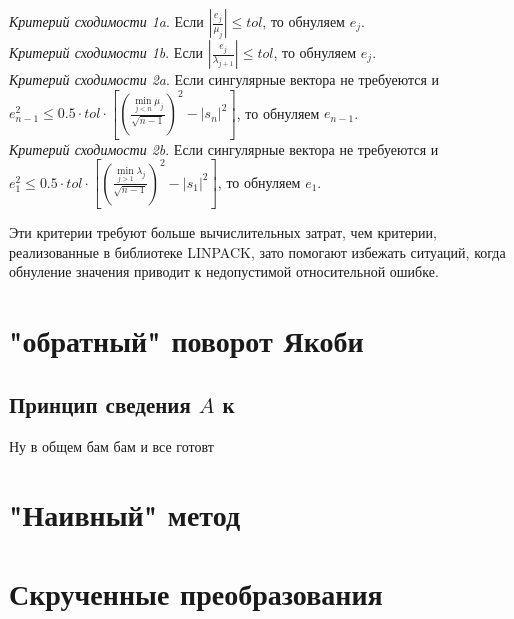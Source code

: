 \documentclass[12pt, a4paper]{report}
\theoremstyle{note}
\begin{document}
\noindent\textit{Критерий сходимости 1a}. Если $|\frac{e_j}{\mu_j}|\leq tol$, то обнуляем $e_j$.\vspace{1em}
\\\textit{Критерий сходимости 1b}. Если $|\frac{e_j}{\lambda_{j+1}}|\leq tol$, то обнуляем $e_j$.\vspace{1em}
\\\textit{Критерий сходимости 2a}. Если сингулярные вектора не требуеются и\linebreak $e^2_{n-1}\leq0.5\cdot tol\cdot [(\frac{\min\limits_{j<n}\mu_j}{\sqrt{n-1}})^2-|s_n|^2]$, то обнуляем $e_{n-1}$.\vspace{1em}
\\\textit{Критерий сходимости 2b}. Если сингулярные вектора не требуеются и\linebreak $e^2_1\leq0.5\cdot tol\cdot [(\frac{\min\limits_{j>1}\lambda_j}{\sqrt{n-1}})^2-|s_1|^2]$, то обнуляем $e_1$.\vspace{1em}

Эти критерии требуют больше вычислительных затрат, чем критерии, реализованные в библиотеке LINPACK, зато помогают избежать ситуаций, когда обнуление значения приводит к недопустимой относительной ошибке.


\chapter{"обратный" поворот Якоби}

\section{Принцип сведения $A$ к \Sigma}
Ну в общем бам бам и все готовт

\chapter{"Наивный" метод}

\chapter{Скрученные преобразования}
\end{document}
